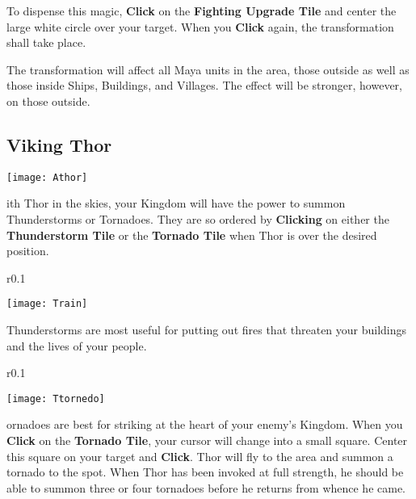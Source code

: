 To dispense this magic, \textbf{Click} on the \textbf{Fighting Upgrade Tile} and center the large white circle over your target. When you \textbf{Click} again, the transformation shall take place.

The transformation will affect all Maya units in the area, those outside as well as those inside Ships, Buildings, and Villages. The effect will be stronger, however, on those outside.

\subsection{Viking Thor}


\begin{center}
    \texttt{[image: Athor]}
\end{center}

ith Thor in the skies, your Kingdom will have the power to summon Thunderstorms or Tornadoes. They are so ordered by \textbf{Clicking} on either the \textbf{Thunderstorm Tile} or the \textbf{Tornado Tile} when Thor is over the desired position.

\begin{wrapfigure}{r}{0.1\textwidth}
    \vspace{-20pt}
    \begin{center}
        \texttt{[image: Train]}
    \end{center}
    \vspace{-20pt}
\end{wrapfigure}

Thunderstorms are most useful for putting out fires that threaten your buildings and the lives of your people. \\

\begin{wrapfigure}{r}{0.1\textwidth}
    \vspace{-20pt}
    \begin{center}
        \texttt{[image: Ttornedo]}
    \end{center}
    \vspace{-20pt}
\end{wrapfigure}

ornadoes are best for striking at the heart of your enemy’s Kingdom. When you \textbf{Click} on the \textbf{Tornado Tile}, your cursor will change into a small square. Center this square on your target and \textbf{Click}. Thor will fly to the area and summon a tornado to the spot. When Thor has been invoked at full strength, he should be able to summon three or four tornadoes before he returns from whence he came.

